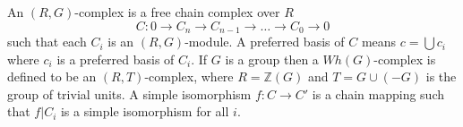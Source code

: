 An $(R, G)$-complex is a free chain complex over $R$
$$C: 0 \rightarrow C_n \rightarrow C_{n-1} \rightarrow \ldots \rightarrow C_0 \rightarrow 0$$
such that each $C_i$ is an $(R, G)$-module. A preferred basis of $C$ means $c = \bigcup c_i$ where $c_i$ is a preferred basis of $C_i$. If $G$ is a group then a $Wh(G)$-complex is defined to be an $(R, T)$-complex, where $R = \mathbb{Z}(G)$ and $T = G \cup (-G)$ is the group of trivial units. A simple isomorphism $f: C \rightarrow C'$ is a chain mapping such that $f|C_i$ is a simple isomorphism for all $i$.

